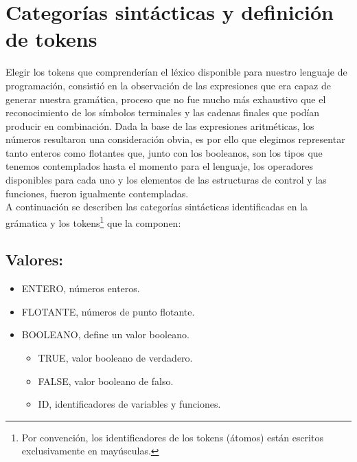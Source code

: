 \documentclass[12pt]{article}
\begin{document}
\section{Categorías sintácticas y definición de tokens}
Elegir los tokens que comprenderían el léxico disponible para nuestro lenguaje de programación, consistió en la observación de las expresiones que era capaz de generar nuestra gramática, proceso que no fue mucho más exhaustivo que el reconocimiento de los símbolos terminales y las cadenas finales que podían producir en combinación. Dada la base de las expresiones aritméticas, los números resultaron una consideración obvia, es por ello que elegimos representar tanto enteros como flotantes que, junto con los booleanos, son los tipos que tenemos contemplados hasta el momento para el lenguaje, los operadores
disponibles para cada uno y los elementos de las estructuras de control y las funciones, fueron igualmente contempladas.\\ 

A continuación se describen las categorías sintácticas identificadas en la grámatica y los tokens\footnote{Por convención, los identificadores de los tokens (átomos) están escritos exclusivamente en mayúsculas.} que la componen:\\
\subsection{Valores:}
\begin{itemize}
  \item ENTERO, números enteros.
    \item FLOTANTE, números de punto flotante.
    \item BOOLEANO, define un valor booleano.
      \begin{itemize}
      \item TRUE, valor booleano de verdadero.
      \item FALSE, valor booleano de falso.
      \item ID, identificadores de variables y funciones.
      \end{itemize}
\end{itemize}
\end{document}
